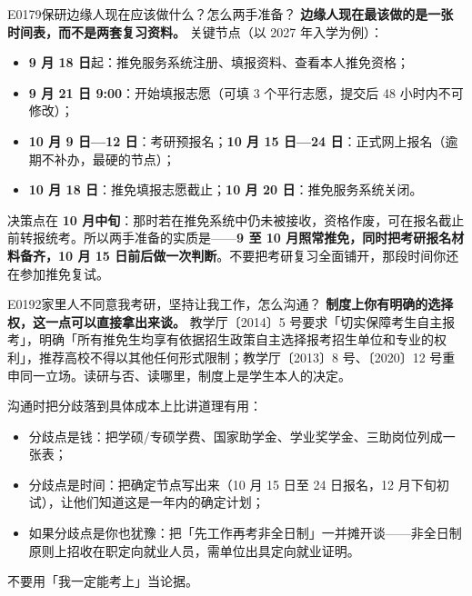 \begin{qa}{E0179}{保研边缘人现在应该做什么？怎么两手准备？}
\textbf{边缘人现在最该做的是一张时间表，而不是两套复习资料。}
关键节点（以 2027 年入学为例）：
\begin{itemize}
  \item \textbf{9 月 18 日}起：推免服务系统注册、填报资料、查看本人推免资格；
  \item \textbf{9 月 21 日 9:00}：开始填报志愿（可填 3 个平行志愿，提交后 48 小时内不可修改）；
  \item \textbf{10 月 9 日—12 日}：考研预报名；\textbf{10 月 15 日—24 日}：正式网上报名（逾期不补办，最硬的节点）；
  \item \textbf{10 月 18 日}：推免填报志愿截止；\textbf{10 月 20 日}：推免服务系统关闭。
\end{itemize}

决策点在 \textbf{10 月中旬}：那时若在推免系统中仍未被接收，资格作废，可在报名截止前转报统考。所以两手准备的实质是——\textbf{9 至 10 月照常推免，同时把考研报名材料备齐，10 月 15 日前后做一次判断}。不要把考研复习全面铺开，那段时间你还在参加推免复试。
\end{qa}

\begin{qa}{E0192}{家里人不同意我考研，坚持让我工作，怎么沟通？}
\textbf{制度上你有明确的选择权，这一点可以直接拿出来谈。}
教学厅〔2014〕5 号要求「切实保障考生自主报考」，明确「所有推免生均享有依据招生政策自主选择报考招生单位和专业的权利」，推荐高校不得以其他任何形式限制；教学厅〔2013〕8 号、〔2020〕12 号重申同一立场。读研与否、读哪里，制度上是学生本人的决定。

沟通时把分歧落到具体成本上比讲道理有用：
\begin{itemize}
  \item 分歧点是钱：把学硕/专硕学费、国家助学金、学业奖学金、三助岗位列成一张表；
  \item 分歧点是时间：把确定节点写出来（10 月 15 日至 24 日报名，12 月下旬初试），让他们知道这是一年内的确定计划；
  \item 如果分歧点是你也犹豫：把「先工作再考非全日制」一并摊开谈——非全日制原则上招收在职定向就业人员，需单位出具定向就业证明。
\end{itemize}

不要用「我一定能考上」当论据。
\end{qa}

